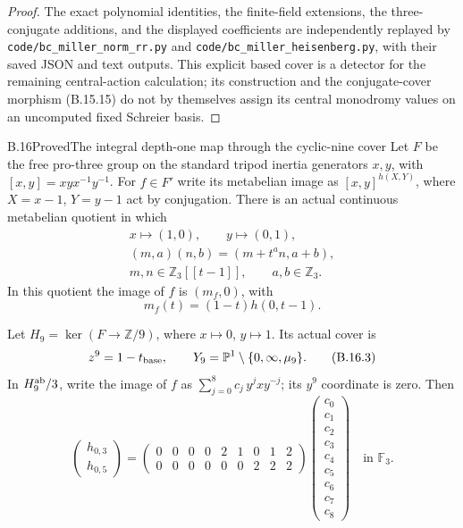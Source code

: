 \begin{proof}
The exact polynomial identities, the finite-field
extensions, the three-conjugate additions, and the
displayed coefficients are independently replayed by
\texttt{code/bc\_miller\_norm\_rr.py} and
\texttt{code/bc\_miller\_heisenberg.py}, with their saved
JSON and text outputs.  This explicit based cover is a
detector for the remaining central-action calculation;
its construction and the conjugate-cover morphism
(B.15.15) do not by themselves assign its central
monodromy values on an uncomputed fixed Schreier basis.
\end{proof}

\begin{statement}{B.16}{Proved}{The integral depth-one map through the cyclic-nine cover}
Let $F$ be the free pro-three group on the standard
tripod inertia generators $x,y$, with
$[x,y]=xyx^{-1}y^{-1}$.
For $f\in F'$ write its metabelian image as
$[x,y]^{h(X,Y)}$, where $X=x-1$, $Y=y-1$ act by
conjugation.  There is an actual continuous
metabelian quotient in which
\[
 \begin{gathered}
 x\longmapsto(1,0),\qquad y\longmapsto(0,1),\\
 (m,a)(n,b)=(m+t^a n,a+b),\\
 m,n\in\mathbb Z_3[[t-1]],\qquad a,b\in\mathbb Z_3.
 \end{gathered}
                                                               \tag{B.16.1}
\]
In this quotient the image of $f$ is $(m_f,0)$, with
\[
                   m_f(t)=(1-t)h(0,t-1).                  \tag{B.16.2}
\]

Let $H_9=\ker(F\to\mathbb Z/9)$, where $x\mapsto0$,
$y\mapsto1$.  Its actual cover is
\[
 z^9=1-t_{\rm base},\qquad
 Y_9=\mathbb P^1\setminus\{0,\infty,\mu_9\}.
                                                               \tag{B.16.3}
\]
In $H_9^{\rm ab}/3$, write the image of $f$ as
$\sum_{j=0}^8c_j\,y^jxy^{-j}$; its $y^9$ coordinate
is zero.  Then
\[
 \begin{pmatrix}h_{0,3}\\h_{0,5}\end{pmatrix}
 =
 \begin{pmatrix}
 0&0&0&0&2&1&0&1&2\\
 0&0&0&0&0&0&2&2&2
 \end{pmatrix}
 \begin{pmatrix}c_0\\c_1\\c_2\\c_3\\c_4\\c_5\\c_6\\c_7\\c_8\end{pmatrix}
 \quad\text{in }\mathbb F_3.                              \tag{B.16.4}
\]


\end{statement}
